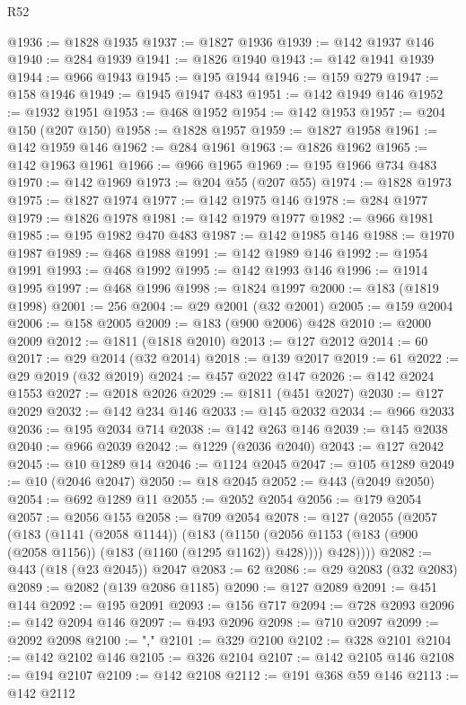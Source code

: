 \begin{lexlean}{R52}
\begin{coremodule}
@1936 := @1828 @1935
@1937 := @1827 @1936
@1939 := @142 @1937 @146
@1940 := @284 @1939
@1941 := @1826 @1940
@1943 := @142 @1941 @1939
@1944 := @966 @1943
@1945 := @195 @1944
@1946 := @159 @279
@1947 := @158 @1946
@1949 := @1945 @1947 @483
@1951 := @142 @1949 @146
@1952 := @1932 @1951
@1953 := @468 @1952
@1954 := @142 @1953
@1957 := @204 @150 (@207 @150)
@1958 := @1828 @1957
@1959 := @1827 @1958
@1961 := @142 @1959 @146
@1962 := @284 @1961
@1963 := @1826 @1962
@1965 := @142 @1963 @1961
@1966 := @966 @1965
@1969 := @195 @1966 @734 @483
@1970 := @142 @1969
@1973 := @204 @55 (@207 @55)
@1974 := @1828 @1973
@1975 := @1827 @1974
@1977 := @142 @1975 @146
@1978 := @284 @1977
@1979 := @1826 @1978
@1981 := @142 @1979 @1977
@1982 := @966 @1981
@1985 := @195 @1982 @470 @483
@1987 := @142 @1985 @146
@1988 := @1970 @1987
@1989 := @468 @1988
@1991 := @142 @1989 @146
@1992 := @1954 @1991
@1993 := @468 @1992
@1995 := @142 @1993 @146
@1996 := @1914 @1995
@1997 := @468 @1996
@1998 := @1824 @1997
@2000 := @183 (@1819 @1998)
@2001 := 256
@2004 := @29 @2001 (@32 @2001)
@2005 := @159 @2004
@2006 := @158 @2005
@2009 := @183 (@900 @2006) @428
@2010 := @2000 @2009
@2012 := @1811 (@1818 @2010)
@2013 := @127 @2012
@2014 := 60
@2017 := @29 @2014 (@32 @2014)
@2018 := @139 @2017
@2019 := 61
@2022 := @29 @2019 (@32 @2019)
@2024 := @457 @2022 @147
@2026 := @142 @2024 @1553
@2027 := @2018 @2026
@2029 := @1811 (@451 @2027)
@2030 := @127 @2029
@2032 := @142 @234 @146
@2033 := @145 @2032
@2034 := @966 @2033
@2036 := @195 @2034 @714
@2038 := @142 @263 @146
@2039 := @145 @2038
@2040 := @966 @2039
@2042 := @1229 (@2036 @2040)
@2043 := @127 @2042
@2045 := @10 @1289 @14
@2046 := @1124 @2045
@2047 := @105 @1289
@2049 := @10 (@2046 @2047)
@2050 := @18 @2045
@2052 := @443 (@2049 @2050)
@2054 := @692 @1289 @11
@2055 := @2052 @2054
@2056 := @179 @2054
@2057 := @2056 @155
@2058 := @709 @2054
@2078 := @127
    (@2055
      (@2057
        (@183
          (@1141 (@2058 @1144))
          (@183
            (@1150 (@2056 @1153 (@183 (@900 (@2058 @1156)) (@183 (@1160 (@1295 @1162)) @428))))
            @428))))
@2082 := @443 (@18 (@23 @2045)) @2047
@2083 := 62
@2086 := @29 @2083 (@32 @2083)
@2089 := @2082 (@139 @2086 @1185)
@2090 := @127 @2089
@2091 := @451 @144
@2092 := @195 @2091
@2093 := @156 @717
@2094 := @728 @2093
@2096 := @142 @2094 @146
@2097 := @493 @2096
@2098 := @710 @2097
@2099 := @2092 @2098
@2100 := ","
@2101 := @329 @2100
@2102 := @328 @2101
@2104 := @142 @2102 @146
@2105 := @326 @2104
@2107 := @142 @2105 @146
@2108 := @194 @2107
@2109 := @142 @2108
@2112 := @191 @368 @59 @146
@2113 := @142 @2112

\end{coremodule}
\end{lexlean}
